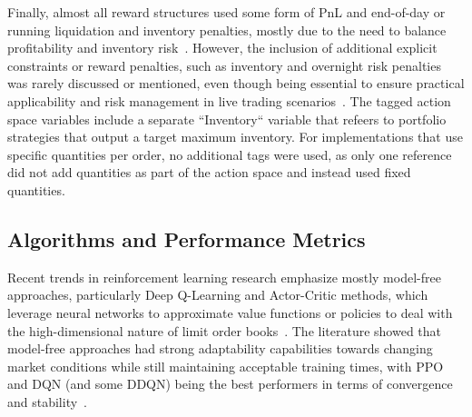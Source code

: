 Finally, almost all reward structures used some form of PnL and end-of-day or running liquidation and inventory penalties,
mostly due to the need to balance profitability and inventory risk~\cite{Sun2022, Gasperov2021}.
However, the inclusion of additional explicit constraints or reward penalties, such as inventory and overnight risk penalties was rarely discussed or mentioned,
even though being essential to ensure practical applicability and risk management in live trading scenarios~\cite{Jerome2022a, Selser2021a}.
The tagged action space variables include a separate ``Inventory`` variable that refeers to portfolio strategies that output a target maximum inventory.
For implementations that use specific quantities per order, no additional tags were used, as only one reference did not add quantities as part of the action space and instead used fixed quantities.

\subsection{Algorithms and Performance Metrics}
\label{subsec:algorithms-and-performance-metrics}
Recent trends in reinforcement learning research emphasize mostly model-free approaches, particularly Deep Q-Learning and Actor-Critic methods,
which leverage neural networks to approximate value functions or policies to deal with the high-dimensional nature of limit order books~\cite{Patel2018, Ganesh2019}.
The literature showed that model-free approaches had strong adaptability capabilities towards changing market conditions
while still maintaining acceptable training times, with PPO and DQN (and some DDQN) being the best performers in terms of convergence and stability~\cite{Sun2022, Gasperov2021a}.

\begin{figure}[H]
    \centering
\end{figure}

